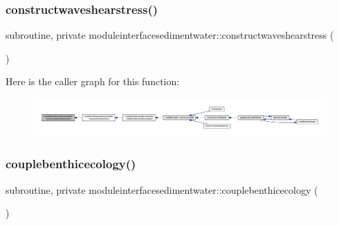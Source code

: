 \subsubsection{\texorpdfstring{constructwaveshearstress()}{constructwaveshearstress()}}
{\footnotesize\ttfamily subroutine, private moduleinterfacesedimentwater\+::constructwaveshearstress (\begin{DoxyParamCaption}{ }\end{DoxyParamCaption})\hspace{0.3cm}{\ttfamily [private]}}

Here is the caller graph for this function\+:\nopagebreak
\begin{figure}[H]
\begin{center}
\leavevmode
\includegraphics[width=350pt]{namespacemoduleinterfacesedimentwater_a068eb47dacf7b4047f132db2a3fd8022_icgraph}
\end{center}
\end{figure}
\mbox{\label{namespacemoduleinterfacesedimentwater_a3f246d5d6de3e05347807acd5b8422a1}} 
\subsubsection{\texorpdfstring{couplebenthicecology()}{couplebenthicecology()}}
{\footnotesize\ttfamily subroutine, private moduleinterfacesedimentwater\+::couplebenthicecology (\begin{DoxyParamCaption}{ }\end{DoxyParamCaption})\hspace{0.3cm}{\ttfamily [private]}}

